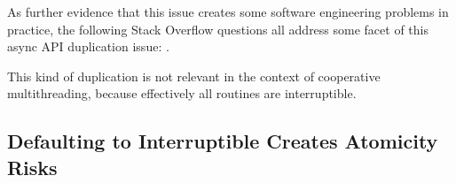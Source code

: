\documentclass[a4paper,UKenglish,cleveref, autoref]{lipics-v2019}
\begin{document}



As further evidence that this issue creates some software engineering problems in practice, the following Stack Overflow questions all address some facet of this async API duplication issue:
\cite{ceco2015, Rice2015, Gray2013, jay2013, Kock2014}.

This kind of duplication is not relevant in the context of cooperative multithreading, because effectively all routines are interruptible.

\subsection{Defaulting to Interruptible Creates Atomicity Risks}
\end{document}
